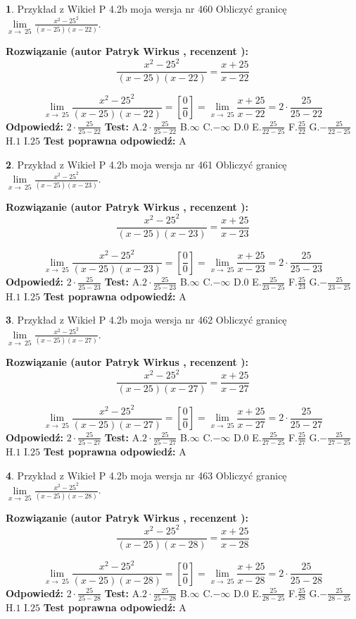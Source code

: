 \documentclass[12pt, a4paper]{article}
\theoremstyle{definition} %
\newtheorem{zad}{}
\newcommand{\zadStart}[1]{\begin{zad}#1\newline}
\newcommand{\zadStop}{\end{zad}}
\newcommand{\rozwStart}[2]{\noindent \textbf{Rozwiązanie (autor #1 , recenzent #2): }\newline}
\newcommand{\rozwStop}{\newline}
\newcommand{\odpStart}{\noindent \textbf{Odpowiedź:}\newline}
\newcommand{\odpStop}{\newline}
\newcommand{\testStart}{\noindent \textbf{Test:}\newline}
\newcommand{\testStop}{\newline}
\newcommand{\kluczStart}{\noindent \textbf{Test poprawna odpowiedź:}\newline}
\newcommand{\kluczStop}{\newline}
\begin{document}
\zadStart{Przykład z Wikieł P 4.2b moja wersja nr 460}
Obliczyć granicę $\lim\limits_{x\to\ 25}\frac{x^{2}-25^{2}}{(x-25)(x-22)}$.
\zadStop
\rozwStart{Patryk Wirkus}{}
$$\frac{x^{2}-25^{2}}{(x-25)(x-22)}=\frac{x+25}{x-22}$$

$$\lim\limits_{x\to\ 25}\frac{x^{2}-25^{2}}{(x-25)(x-22)}=[\frac{0}{0}]=\lim\limits_{x\to\ 25}\frac{x+25}{x-22}=2 \cdot \frac{25}{25-22}$$
\rozwStop
\odpStart
$2 \cdot \frac{25}{25-22}$
\odpStop
\testStart
A.$2 \cdot \frac{25}{25-22}$
B.$\infty$
C.$-\infty$
D.$0$
E.$\frac{25}{22-25}$
F.$\frac{25}{22}$
G.$-\frac{25}{22-25}$
H.$1$
I.$25$
\testStop
\kluczStart
A
\kluczStop



\zadStart{Przykład z Wikieł P 4.2b moja wersja nr 461}
Obliczyć granicę $\lim\limits_{x\to\ 25}\frac{x^{2}-25^{2}}{(x-25)(x-23)}$.
\zadStop
\rozwStart{Patryk Wirkus}{}
$$\frac{x^{2}-25^{2}}{(x-25)(x-23)}=\frac{x+25}{x-23}$$

$$\lim\limits_{x\to\ 25}\frac{x^{2}-25^{2}}{(x-25)(x-23)}=[\frac{0}{0}]=\lim\limits_{x\to\ 25}\frac{x+25}{x-23}=2 \cdot \frac{25}{25-23}$$
\rozwStop
\odpStart
$2 \cdot \frac{25}{25-23}$
\odpStop
\testStart
A.$2 \cdot \frac{25}{25-23}$
B.$\infty$
C.$-\infty$
D.$0$
E.$\frac{25}{23-25}$
F.$\frac{25}{23}$
G.$-\frac{25}{23-25}$
H.$1$
I.$25$
\testStop
\kluczStart
A
\kluczStop



\zadStart{Przykład z Wikieł P 4.2b moja wersja nr 462}
Obliczyć granicę $\lim\limits_{x\to\ 25}\frac{x^{2}-25^{2}}{(x-25)(x-27)}$.
\zadStop
\rozwStart{Patryk Wirkus}{}
$$\frac{x^{2}-25^{2}}{(x-25)(x-27)}=\frac{x+25}{x-27}$$

$$\lim\limits_{x\to\ 25}\frac{x^{2}-25^{2}}{(x-25)(x-27)}=[\frac{0}{0}]=\lim\limits_{x\to\ 25}\frac{x+25}{x-27}=2 \cdot \frac{25}{25-27}$$
\rozwStop
\odpStart
$2 \cdot \frac{25}{25-27}$
\odpStop
\testStart
A.$2 \cdot \frac{25}{25-27}$
B.$\infty$
C.$-\infty$
D.$0$
E.$\frac{25}{27-25}$
F.$\frac{25}{27}$
G.$-\frac{25}{27-25}$
H.$1$
I.$25$
\testStop
\kluczStart
A
\kluczStop



\zadStart{Przykład z Wikieł P 4.2b moja wersja nr 463}
Obliczyć granicę $\lim\limits_{x\to\ 25}\frac{x^{2}-25^{2}}{(x-25)(x-28)}$.
\zadStop
\rozwStart{Patryk Wirkus}{}
$$\frac{x^{2}-25^{2}}{(x-25)(x-28)}=\frac{x+25}{x-28}$$

$$\lim\limits_{x\to\ 25}\frac{x^{2}-25^{2}}{(x-25)(x-28)}=[\frac{0}{0}]=\lim\limits_{x\to\ 25}\frac{x+25}{x-28}=2 \cdot \frac{25}{25-28}$$
\rozwStop
\odpStart
$2 \cdot \frac{25}{25-28}$
\odpStop
\testStart
A.$2 \cdot \frac{25}{25-28}$
B.$\infty$
C.$-\infty$
D.$0$
E.$\frac{25}{28-25}$
F.$\frac{25}{28}$
G.$-\frac{25}{28-25}$
H.$1$
I.$25$
\testStop
\kluczStart
A
\kluczStop
\end{document}
